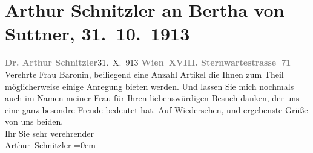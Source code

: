 

         
         \renewcommand{\erwaehntePersonen}{Personen: Olga Schnitzler, Bertha von Suttner}
         \renewcommand{\erwaehnteOrte}{Orte: Sternwartestraße 71, Wien}
         \renewcommand{\erwaehnteWerke}{}
               \section[Arthur Schnitzler an Bertha von Suttner, 31. 10. 1913]{ Arthur Schnitzler an Bertha von Suttner, 31. 10. 1913}\nopagebreak{}\rehead{ }\begin{ledgroupsized}[t]{13cm}\normalsize\beginnumbering{} \toendnotes[C]{\smallbreak\pagebreak[2]} 
\toendnotes[C]{\smallbreak}\pstart
           \noindent{}{\pb}\textcolor{gray}{\textbf{Dr. Arthur Schnitzler}}\hfill 31. X. 913\pend
           \pstart
           \textcolor{gray}{\textbf{Wien XVIII. Sternwartestrasse 71}}\pend
           \pstart{}Verehrte Frau Baronin,\pend\pstart
           beiliegend eine Anzahl Artikel die Ihnen zum Theil möglicherweise einige Anregung
               bieten werden. Und lassen Sie mich nochmals auch im Namen meiner Frau für Ihren liebenswürdigen Besuch {\pb}danken, der uns eine ganz besondre Freude bedeutet hat.\pend
           \pstart
           Auf Wiedersehen, und ergebenste Grüße von uns beiden.{\\[\baselineskip]}Ihr Sie sehr verehrender{\\[\baselineskip]}\spacefill\mbox{Arthur Schnitzler}\pend
           \leftskip=0em{}
         
         \endnumbering{}\end{ledgroupsized}  \newcommand{\dateiname}{L02155}\newcommand{\titel}{Arthur Schnitzler an Bertha von Suttner, 31. 10. 1913}\newcommand{\editorInnen}{Martin Anton Müller und Gerd-Hermann Susen}
      